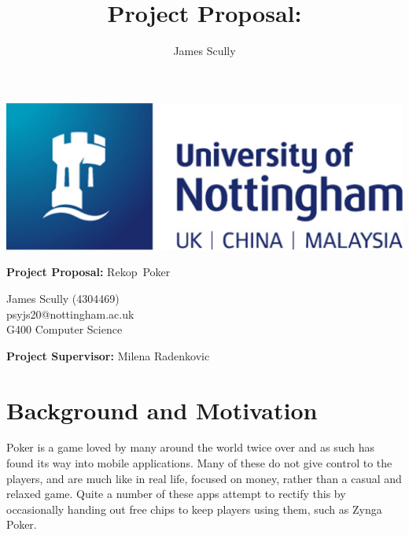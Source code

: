 \documentclass[11pt]{article}
\title{Project Proposal: \pt}
\author{James Scully}
\newcommand{\pn}{Rekop}
\begin{document}
{\selectfont


\hspace{0pt}

\vfill

\begin{center}
	\includegraphics[scale=0.35]{uni_logo}
	
	\vspace{1cm}
	
	{\Large \textbf{Project Proposal:} \pn \ Poker} \linebreak
	
	\begin{large}
		James Scully (4304469) \\
		psyjs20@nottingham.ac.uk \\
		G400 Computer Science \\
	\end{large}
	
\end{center}

\vfill

\begin{center}
	\textbf{Project Supervisor:} Milena Radenkovic
\end{center}

\hspace{0pt}

\pagebreak

\section*{Background and Motivation}



Poker is a game loved by many around the world twice over and as such has found its way into mobile applications. Many of these do not give control to the players, and are much like in real life, focused on money, rather than a casual and relaxed game. Quite a number of these apps attempt to rectify this by occasionally handing out free chips to keep players using them, such as Zynga Poker. \\

}
\end{document}
